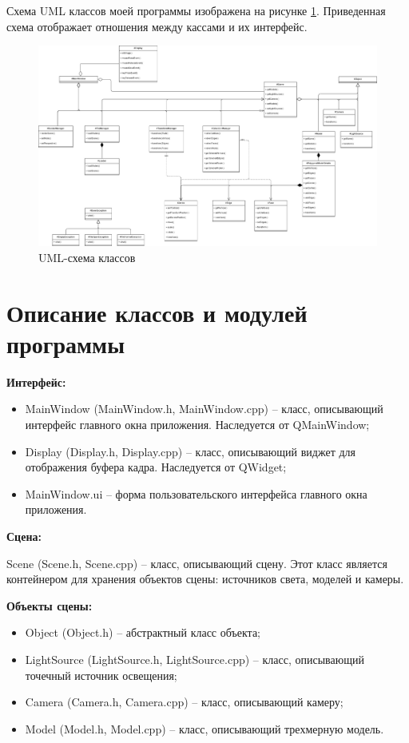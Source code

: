 Схема UML классов моей программы изображена на рисунке \ref{fig:uml}. Приведенная схема отображает отношения между кассами и их интерфейс.

\begin{figure}[h]
	\centering
	\includegraphics[scale=0.4, angle=-90]{inc/img/uml.jpg}
	\caption{UML-схема классов}
	\label{fig:uml}
\end{figure} 

\clearpage

\section{Описание классов и модулей программы}

\textbf{Интерфейс:}
\begin{itemize}[label=---]
\item MainWindow (MainWindow.h, MainWindow.cpp) – класс, описывающий интерфейс главного окна приложения. Наследуется от QMainWindow;
\item Display (Display.h, Display.cpp) – класс, описывающий виджет для отображения буфера кадра. Наследуется от QWidget;
\item MainWindow.ui – форма пользовательского интерфейса главного окна приложения.
\end{itemize}


\textbf{Сцена:} 

Scene (Scene.h, Scene.cpp) – класс, описывающий сцену. Этот класс является контейнером для хранения объектов сцены: источников света, моделей и камеры.

\textbf{Объекты сцены:}
\begin{itemize}[label=---]
\item Object (Object.h) – абстрактный класс объекта;
\item LightSource (LightSource.h, LightSource.cpp) – класс, описывающий точечный источник освещения;
\item Camera (Camera.h, Camera.cpp) – класс, описывающий камеру;
\item Model (Model.h, Model.cpp) – класс, описывающий трехмерную модель.
\end{itemize}

